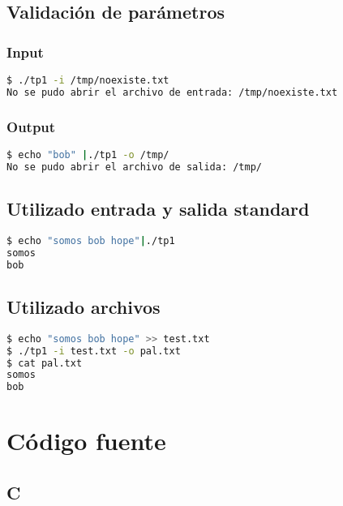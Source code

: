\documentclass[10pt,a4paper]{article}
\begin{document}
\subsection{Validación de parámetros}

\subsubsection{Input}

\begin{lstlisting}[language=bash]
$ ./tp1 -i /tmp/noexiste.txt
No se pudo abrir el archivo de entrada: /tmp/noexiste.txt
\end{lstlisting}

\subsubsection{Output}

\begin{lstlisting}[language=bash]
$ echo "bob" |./tp1 -o /tmp/
No se pudo abrir el archivo de salida: /tmp/
\end{lstlisting}

\subsection{Utilizado entrada y salida standard}

\begin{lstlisting}[language=bash]
$ echo "somos bob hope"|./tp1 
somos
bob
\end{lstlisting}

\subsection{Utilizado archivos}

\begin{lstlisting}[language=bash]
$ echo "somos bob hope" >> test.txt
$ ./tp1 -i test.txt -o pal.txt
$ cat pal.txt 
somos
bob
\end{lstlisting}

\newpage

\section{Código fuente}

\subsection{C}
\end{document}
